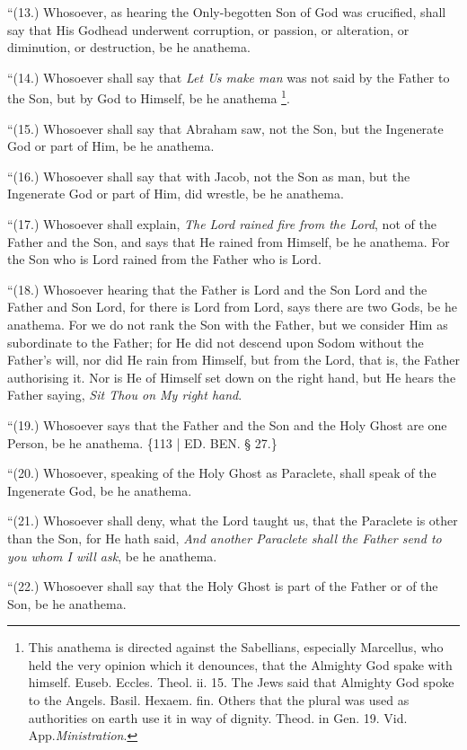 ``(13.) Whosoever, as hearing
the Only-begotten Son of God was crucified, shall say that His Godhead
underwent corruption, or passion, or alteration, or diminution, or
destruction, be he anathema.

``(14.) Whosoever shall say
that \emph{Let Us make man} was not said by the Father to the Son, but
by God to Himself, be he anathema \footnote{This anathema is directed against the Sabellians, especially
Marcellus, who held the very opinion which it denounces, that the
Almighty God spake with himself. Euseb. Eccles. Theol. ii. 15. The
Jews said that Almighty God spoke to the Angels. Basil. Hexaem. fin.
Others that the plural was used as authorities on earth use it in way
of dignity. Theod. in Gen. 19. Vid. App.\emph{Ministration}.}.

``(15.) Whosoever shall say
that Abraham saw, not the Son, but the Ingenerate God or part of Him,
be he anathema.

``(16.) Whosoever shall say
that with Jacob, not the Son as man, but the Ingenerate God or part of
Him, did wrestle, be he anathema.

``(17.) Whosoever shall
explain, \emph{The Lord rained fire from the Lord}, not of the Father
and the Son, and says that He rained from Himself, be he anathema. For
the Son who is Lord rained from the Father who is Lord.

``(18.) Whosoever hearing that
the Father is Lord and the Son Lord and the Father and Son Lord, for
there is Lord from Lord, says there are two Gods, be he anathema. For
we do not rank the Son with the Father, but we consider Him as
subordinate to the Father; for He did not descend upon Sodom without
the Father's will, nor did He rain from Himself, but from the Lord,
that is, the Father authorising it. Nor is He of Himself set down on
the right hand, but He hears the Father saying, \emph{Sit Thou on My
right hand}.

``(19.) Whosoever says that the
Father and the Son and the Holy Ghost are one Person, be he anathema.
\{113 | ED.
BEN. § 27.\}

``(20.) Whosoever, speaking of
the Holy Ghost as Paraclete, shall speak of the Ingenerate God, be he
anathema.

``(21.) Whosoever shall deny,
what the Lord taught us, that the Paraclete is other than the Son, for
He hath said, \emph{And another Paraclete shall the Father send to you
whom I will ask}, be he anathema.

``(22.) Whosoever shall say
that the Holy Ghost is part of the Father or of the Son, be he
anathema.


